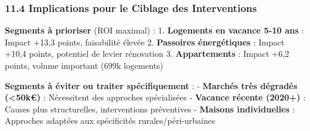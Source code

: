 \documentclass[11pt]{article}
\makeatletter
\newcommand{\boxspacing}{\kern\kvtcb@left@rule\kern\kvtcb@boxsep}
\newcommand{\prompt}[4]{
        {\ttfamily\llap{{\color{#2}[#3]:\hspace{3pt}#4}}\vspace{-\baselineskip}}
    }
\makeatother
\begin{document}
\subsubsection{11.4 Implications pour le Ciblage des
Interventions}\label{implications-pour-le-ciblage-des-interventions}

\textbf{Segments à prioriser} (ROI maximal) : 1. \textbf{Logements en
vacance 5-10 ans} : Impact +13,3 points, faisabilité élevée 2.
\textbf{Passoires énergétiques} : Impact +10,4 points, potentiel de
levier rénovation 3. \textbf{Appartements} : Impact +6,2 points, volume
important (699k logements)

\textbf{Segments à éviter ou traiter spécifiquement} : - \textbf{Marchés
très dégradés (\textless50k€)} : Nécessitent des approches spécialisées
- \textbf{Vacance récente (2020+)} : Causes plus structurelles,
interventions préventives - \textbf{Maisons individuelles} : Approches
adaptées aux spécificités rurales/péri-urbaines

    \begin{tcolorbox}[breakable, size=fbox, boxrule=1pt, pad at break*=1mm,colback=cellbackground, colframe=cellborder]
\prompt{In}{incolor}{ }{\boxspacing}
\begin{Verbatim}[commandchars=\\\{\}]

\end{Verbatim}
\end{tcolorbox}

    \begin{tcolorbox}[breakable, size=fbox, boxrule=1pt, pad at break*=1mm,colback=cellbackground, colframe=cellborder]
\prompt{In}{incolor}{ }{\boxspacing}
\begin{Verbatim}[commandchars=\\\{\}]

\end{Verbatim}
\end{tcolorbox}


    
    
    
\end{document}
